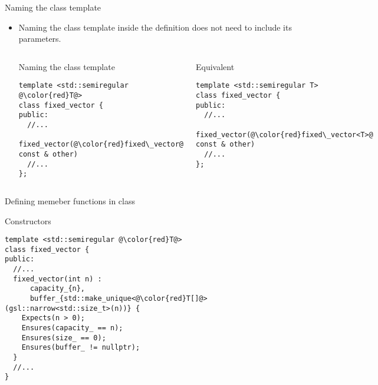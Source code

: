\begin{frame}[t,fragile]{Naming the class template}
\begin{itemize}
  \item Naming the class template inside the definition does not need to include its parameters.

\begin{columns}[T]

\begin{block}{Naming the class template}
\begin{lstlisting}[escapechar=@]
template <std::semiregular @\color{red}T@>
class fixed_vector {
public:
  //...
  fixed_vector(@\color{red}fixed\_vector@ const & other)
  //...
};
\end{lstlisting}
\end{block}

\begin{block}{Equivalent}
\begin{lstlisting}[escapechar=@]
template <std::semiregular T>
class fixed_vector {
public:
  //...
  fixed_vector(@\color{red}fixed\_vector<T>@ const & other)
  //...
};
\end{lstlisting}
\end{block}

\end{columns}
\end{itemize}
\end{frame}


\begin{frame}[t,fragile]{Defining memeber functions in class}
\begin{block}{Constructors}
\begin{lstlisting}[escapechar=@]
template <std::semiregular @\color{red}T@>
class fixed_vector {
public:
  //...
  fixed_vector(int n) :
      capacity_{n},
      buffer_{std::make_unique<@\color{red}T[]@>(gsl::narrow<std::size_t>(n))} {
    Expects(n > 0);
    Ensures(capacity_ == n);
    Ensures(size_ == 0);
    Ensures(buffer_ != nullptr);
  }
  //...
}
\end{lstlisting}
\end{block}
\end{frame}

